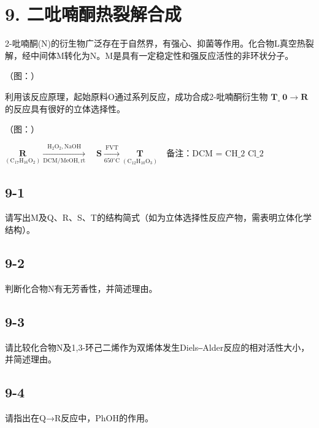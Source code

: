 \section*{9. 二吡喃酮热裂解合成}
2-吡喃酮(N)的衍⽣物⼴泛存在于⾃然界，有强⼼、抑菌等作⽤。化合物L真空热裂解，经中间体M转化为N。M是具有⼀定稳定性和强反应活性的⾮环状分⼦。

（图：）

利⽤该反应原理，起始原料O通过系列反应，成功合成2-吡喃酮衍⽣物 $\mathbf { T } _ { \circ } \ \mathbf { 0 } \to \mathbf { R }$ 的反应具有很好的⽴体选择性。

（图：）

$
\underset {\left(\mathrm{C} _ {1 7} \mathrm{H} _ {1 6} \mathrm{O} _ {2}\right)} {\mathbf {R}} \xrightarrow [ \mathrm{DCM/MeOH,rt} ]{\mathrm{H} _ {2} \mathrm{O} _ {2} , \mathrm{NaOH}} \quad \mathbf {S} \xrightarrow [ 6 5 0 ^ {\circ} \mathrm{C} ]{\text {FVT}} \underset {\left(\mathrm{C} _ {1 2} \mathrm{H} _ {1 0} \mathrm{O} _ {3}\right)} {\mathbf {T}} \quad \text {备注：DCM = CH_{2} Cl_{2}}
$

\subsection*{9-1}
请写出M及Q、R、S、T的结构简式（如为⽴体选择性反应产物，需表明⽴体化学结构）。

\subsection*{9-2}
判断化合物N有⽆芳⾹性，并简述理由。

\subsection*{9-3}
请⽐较化合物N及1,3-环⼰⼆烯作为双烯体发⽣Diels‒Alder反应的相对活性⼤⼩，并简述理由。

\subsection*{9-4}
请指出在Q→R反应中，PhOH的作⽤。
